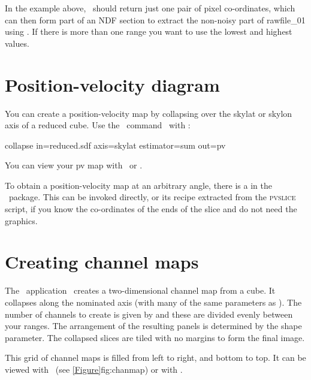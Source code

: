 \documentclass[11pt,oneside,chapters]{starlink}
\providecommand{\chanmap}{\xref{\task{chanmap}}{sun95}{CHANMAP}}
\begin{document}
In the example above, \parget\ should return just one pair of pixel
co-ordinates, which can then form part of an NDF section to extract the
non-noisy part of rawfile\_01 using \ndfcopy. If there is more than one
range you want to use the lowest and highest values.

\section{Position-velocity diagram}

You can create a position-velocity map by collapsing over the skylat
or skylon axis of a reduced cube. Use the \Kappa\ command \collapse\ with
:

\begin{terminalv}
collapse in=reduced.sdf axis=skylat estimator=sum out=pv
\end{terminalv}
You can view your pv map with  \gaia\ or \display.

To obtain a position-velocity map at an arbitrary angle, there is a
 in the \datacube\ package.
This can be invoked directly, or its recipe extracted from the
\textsc{pvslice} script, if you know the co-ordinates of the ends of
the slice and do not need the graphics.

\section{Creating channel maps}
\label{sec:channel}

The \Kappa\ application \chanmap\ creates a two-dimensional channel
map from a cube. It collapses along the nominated axis (with many of
the same parameters as \collapse). The number of channels to create is
given by  and these are divided evenly between your
ranges. The arrangement of the resulting panels is determined by the
shape parameter. The collapsed slices are tiled with no margins to
form the final image.

\begin{terminalv}
\end{terminalv}
This grid of channel maps is filled from left to right, and bottom to
top. It can be viewed with \gaia\ (see \cref{Figure}{fig:chanmap}{}) or
with \display.
\begin{terminalv}
\end{terminalv}
\end{document}
